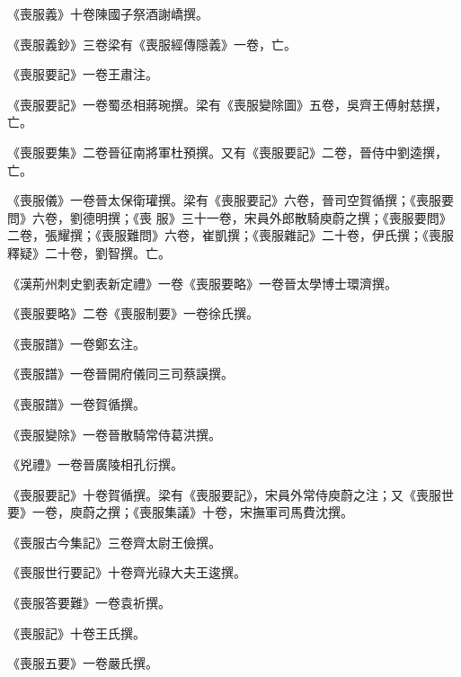 \begin{pinyinscope}
 《喪服義》十卷陳國子祭酒謝嶠撰。



 《喪服義鈔》三卷梁有《喪服經傳隱義》一卷，亡。



 《喪服要記》一卷王肅注。



 《喪服要記》一卷蜀丞相蔣琬撰。梁有《喪服變除圖》五卷，吳齊王傅射慈撰，亡。



 《喪服要集》二卷晉征南將軍杜預撰。又有《喪服要記》二卷，晉侍中劉逵撰，亡。



 《喪服儀》一卷晉太保衛瓘撰。梁有《喪服要記》六卷，晉司空賀循撰；《喪服要問》六卷，劉德明撰；《喪
 服》三十一卷，宋員外郎散騎庾蔚之撰；《喪服要問》二卷，張耀撰；《喪服難問》六卷，崔凱撰；《喪服雜記》二十卷，伊氏撰；《喪服釋疑》二十卷，劉智撰。亡。



 《漢荊州刺史劉表新定禮》一卷《喪服要略》一卷晉太學博士環濟撰。



 《喪服要略》二卷《喪服制要》一卷徐氏撰。



 《喪服譜》一卷鄭玄注。



 《喪服譜》一卷晉開府儀同三司蔡謨撰。



 《喪服譜》一卷賀循撰。



 《喪服變除》一卷晉散騎常侍葛洪撰。



 《兇禮》一卷晉廣陵相孔衍撰。



 《喪服要記》十卷賀循撰。梁有《喪服要記》，宋員外常侍庾蔚之注；又《喪服世要》一卷，庾蔚之撰；《喪服集議》十卷，宋撫軍司馬費沈撰。



 《喪服古今集記》三卷齊太尉王儉撰。



 《喪服世行要記》十卷齊光祿大夫王逡撰。



 《喪服答要難》一卷袁祈撰。



 《喪服記》十卷王氏撰。



 《喪服五要》一卷嚴氏撰。




\end{pinyinscope}
